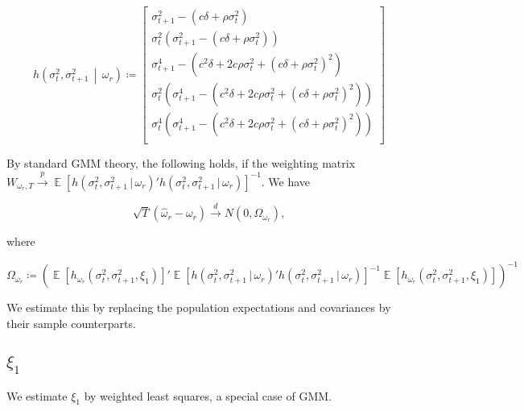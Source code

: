 \documentclass[11pt, letterpaper, twoside, final]{article}
\newcommand*{\dto}{\overset{d}{\longrightarrow}}
\newcommand*{\pto}{\overset{p}{\longrightarrow}}
\newcommand*{\mvert}{\,\middle\vert\,}
\newcommand*{\ivert}{\,\vert\,}
\DeclareMathOperator*{\E}{\mathbb{E}}
\begin{document}
\begin{equation}
    h\left(\sigma^2_{t},\sigma^2_{t+1} \mvert \omega_r\right) \coloneqq 
\begin{bmatrix}
    \sigma^2_{t+1} - (c \delta + \rho \sigma^2_{t}) \\
%
    \sigma^2_{t} \left(\sigma^2_{t+1} - (c \delta + \rho \sigma^2_{t})\right)\\
%
    \sigma^4_{t+1} - \left(c^{2} \delta + 2 c \rho \sigma^2_{t} + \left(c \delta + \rho
    \sigma^2_{t}\right)^{2}\right)\\
%
    \sigma^2_{t} \left(\sigma^4_{t+1} - \left(c^{2} \delta + 2 c \rho \sigma^2_{t} + \left(c \delta + \rho
    \sigma^2_{t}\right)^{2}\right)\right)\\

    \sigma^4_{t} \left(\sigma^4_{t+1} - \left(c^{2} \delta + 2 c \rho \sigma^2_{t} + \left(c \delta + \rho
    \sigma^2_{t}\right)^{2}\right)\right)\\
\end{bmatrix}
\end{equation}

By standard GMM theory, the following holds, if the weighting matrix \newline $W_{\omega_r,T} \pto \E[h(\sigma^2_t,
\sigma^2_{t+1} \ivert \omega_r)' h(\sigma^2_t, \sigma^2_{t+1} \ivert \omega_r)]^{-1}$.
We have 

\begin{equation}
    \sqrt{T}(\widehat{\omega}_r - \omega_r) \dto N\left(0, \Omega_{\omega_r}\right),
\end{equation}

\noindent where

\begin{equation}
    \Omega_{\omega_r} \coloneqq \left(\E\left[h_{\omega_r}(\sigma^2_{t}, \sigma^2_{t+1}, \xi_{1})\right]'
    \E[h(\sigma^2_t, \sigma^2_{t+1} \ivert \omega_r)' h(\sigma^2_t, \sigma^2_{t+1} \ivert \omega_r)]^{-1}
    \E\left[h_{\omega_r}(\sigma^2_{t}, \sigma^2_{t+1}, \xi_{1})\right]\right)^{-1}
\end{equation}

We estimate this by replacing the population expectations and covariances by their sample counterparts.

\subsection{$\xi_1$}\label{sec:est_xi2}

We estimate $\xi_1$ by weighted least squares, a special case of GMM. 
\end{document}

